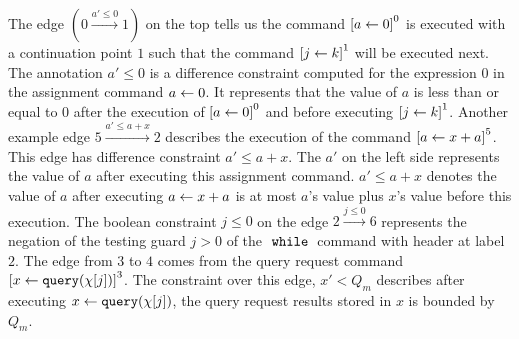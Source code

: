 The edge $(0 \xrightarrow{a' \leq 0} 1)$ on the top tells us the command 
$\clabel{\assign{a}{0}}^0$ is executed with a continuation point $1$ such that the
command $\clabel{\assign{j}{k}}^1$ will be executed next.
The annotation $a' \leq 0$ is a difference constraint 
computed for
the expression $0$ in the assignment command $\mathrel{ a \leftarrow 0 }$.
It represents that the value of $a$ is less than or equal to $0$ after the
execution of $\clabel{\assign{a}{0}}^0$ and before executing $\clabel{\assign{j}{k}}^1$.
Another example edge $5 \xrightarrow{a' \leq a + x } 2$ describes the execution of
 the command
$\clabel{\assign{a}{x + a}}^{5}$.
This edge has difference constraint $a' \leq a+x $.
The $a'$ on the left side represents the value of $a$ after executing this assignment command. 
$a' \leq a+x $ denotes the value of $a$ after executing $\mathrel{ a \leftarrow x + a }$ is at most $a$'s value plus $x$'s value before this execution.
The boolean constraint $j \leq 0 $ on the edge $2 \xrightarrow{j \leq 0} 6$
represents the negation of the testing guard $j > 0$
of the $\;\mathtt{while}\;$ command with header at label $2$.
The edge from $3$ to $4$ comes from the query request command $\clabel{\assign{x}{\query(\chi[j])} }^{3}$.
The constraint over this edge, $x' < Q_m$ describes after executing $\mathrel{ x \leftarrow {\tt query}(\chi[j]) }$,
the query request results stored in $x$ is bounded by $Q_m$. 

